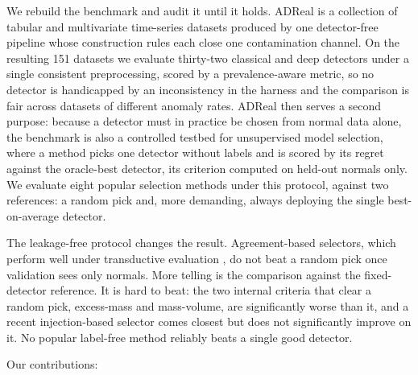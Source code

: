 \documentclass[3p,twocolumn]{elsarticle}
\begin{document}
We rebuild the benchmark and audit it until it holds. ADReal is a collection of tabular and multivariate time-series datasets produced by one detector-free pipeline whose construction rules each close one contamination channel. On the resulting 151 datasets we evaluate thirty-two classical and deep detectors under a single consistent preprocessing, scored by a prevalence-aware metric, so no detector is handicapped by an inconsistency in the harness and the comparison is fair across datasets of different anomaly rates. ADReal then serves a second purpose: because a detector must in practice be chosen from normal data alone, the benchmark is also a controlled testbed for unsupervised model selection, where a method picks one detector without labels and is scored by its regret against the oracle-best detector, its criterion computed on held-out normals only. We evaluate eight popular selection methods under this protocol, against two references: a random pick and, more demanding, always deploying the single best-on-average detector.

The leakage-free protocol changes the result. Agreement-based selectors, which perform well under transductive evaluation \cite{ref4, ref18}, do not beat a random pick once validation sees only normals. More telling is the comparison against the fixed-detector reference. It is hard to beat: the two internal criteria that clear a random pick, excess-mass and mass-volume, are significantly worse than it, and a recent injection-based selector \cite{ref35} comes closest but does not significantly improve on it. No popular label-free method reliably beats a single good detector.

Our contributions:
\end{document}
